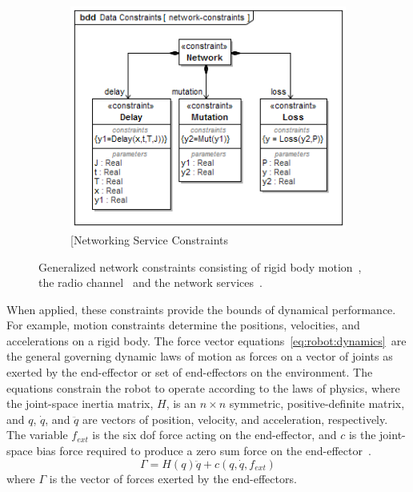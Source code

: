 \begin{figure}[ht]
	\begin{subfigure}{.8\textwidth}
	\centering
	\includegraphics[width=.8\linewidth]{./chapter-sysml/diagrams/bdd__Data_Constraints__network-constraints}  
	\caption{[Networking Service Constraints}
	\label{sysml:fig:constraints:network}
	\end{subfigure}

	\caption{Generalized network constraints consisting of rigid body motion~\protect{}, the radio channel~\protect{} and the network services~\protect{}.}
	\label{sysml:fig:general:constraints}	
	
\end{figure}

When applied, these constraints provide the bounds of dynamical performance.  For example, motion constraints determine the positions, velocities, and accelerations on a rigid body.  The force vector equations~\eqref{eq:robot:dynamics}~are the general governing dynamic laws of motion as forces on a vector of joints as exerted by the end-effector or set of end-effectors on the environment.  The equations constrain the robot to operate according to the laws of physics, where the joint-space inertia matrix, $H$, is an ${n}\times{n}$ symmetric, positive-definite matrix, and $q$, $\dot{q}$, and $\ddot{q}$ are vectors of position, velocity, and acceleration, respectively.  The variable $f_{ext}$ is the six \gls{dof} force acting on the end-effector, and $c$ is the joint-space bias force required to produce a zero sum force on the end-effector~\cite{Featherstone2007}.  
\begin{equation}
\label{eq:robot:dynamics}
\Gamma = H(q) \ddot{q} + c(q,\dot{q},f_{\!ext})
\end{equation}    
where $\Gamma$ is the vector of forces exerted by the end-effectors.  

